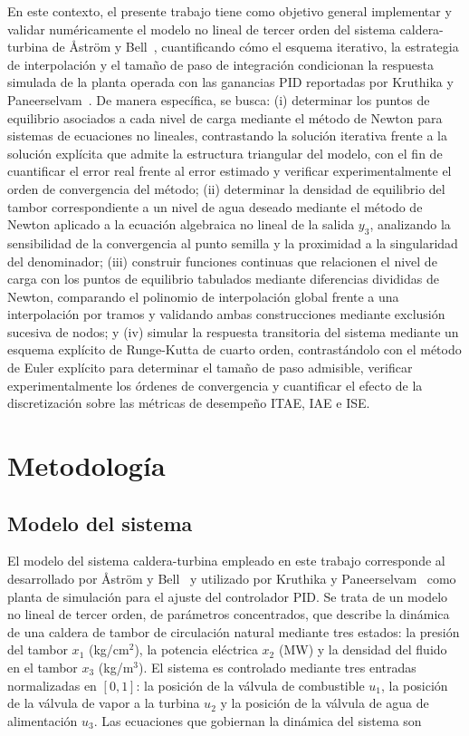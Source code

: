 \documentclass[final,5p,times,twocolumn,authoryear,11pt]{elsarticle}
\begin{document}
En este contexto, el presente trabajo tiene como objetivo general implementar y validar numéricamente el modelo no lineal de tercer orden del sistema caldera-turbina de Åström y Bell~\citep{astrom2000drum}, cuantificando cómo el esquema iterativo, la estrategia de interpolación y el tamaño de paso de integración condicionan la respuesta simulada de la planta operada con las ganancias PID reportadas por Kruthika y Paneerselvam~\citep{kruthika2025novel}. De manera específica, se busca: (i) determinar los puntos de equilibrio asociados a cada nivel de carga mediante el método de Newton para sistemas de ecuaciones no lineales, contrastando la solución iterativa frente a la solución explícita que admite la estructura triangular del modelo, con el fin de cuantificar el error real frente al error estimado y verificar experimentalmente el orden de convergencia del método; (ii) determinar la densidad de equilibrio del tambor correspondiente a un nivel de agua deseado mediante el método de Newton aplicado a la ecuación algebraica no lineal de la salida $y_3$, analizando la sensibilidad de la convergencia al punto semilla y la proximidad a la singularidad del denominador; (iii) construir funciones continuas que relacionen el nivel de carga con los puntos de equilibrio tabulados mediante diferencias divididas de Newton, comparando el polinomio de interpolación global frente a una interpolación por tramos y validando ambas construcciones mediante exclusión sucesiva de nodos; y (iv) simular la respuesta transitoria del sistema mediante un esquema explícito de Runge-Kutta de cuarto orden, contrastándolo con el método de Euler explícito para determinar el tamaño de paso admisible, verificar experimentalmente los órdenes de convergencia y cuantificar el efecto de la discretización sobre las métricas de desempeño ITAE, IAE e ISE.

\section{Metodología}
\label{metodologia}

\subsection{Modelo del sistema}

El modelo del sistema caldera-turbina empleado en este trabajo corresponde al desarrollado por Åström y Bell~\citep{astrom2000drum} y utilizado por Kruthika y Paneerselvam~\citep{kruthika2025novel} como planta de simulación para el ajuste del controlador PID. Se trata de un modelo no lineal de tercer orden, de parámetros concentrados, que describe la dinámica de una caldera de tambor de circulación natural mediante tres estados: la presión del tambor $x_1$ (kg/cm$^2$), la potencia eléctrica $x_2$ (MW) y la densidad del fluido en el tambor $x_3$ (kg/m$^3$). El sistema es controlado mediante tres entradas normalizadas en $[0,1]$: la posición de la válvula de combustible $u_1$, la posición de la válvula de vapor a la turbina $u_2$ y la posición de la válvula de agua de alimentación $u_3$. Las ecuaciones que gobiernan la dinámica del sistema son
\end{document}
